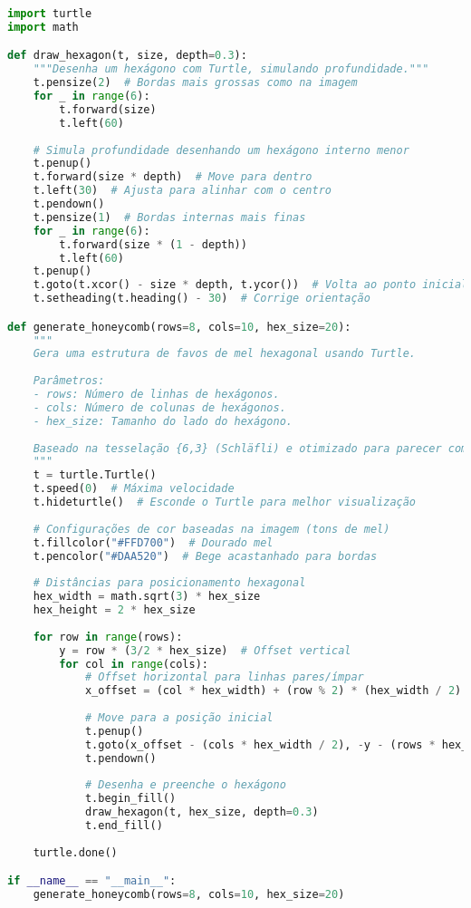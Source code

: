 \documentclass[12pt,a4paper,oneside]{extarticle}
\begin{document}
\begin{lstlisting}[language=python]
import turtle
import math

def draw_hexagon(t, size, depth=0.3):
    """Desenha um hexágono com Turtle, simulando profundidade."""
    t.pensize(2)  # Bordas mais grossas como na imagem
    for _ in range(6):
        t.forward(size)
        t.left(60)
    
    # Simula profundidade desenhando um hexágono interno menor
    t.penup()
    t.forward(size * depth)  # Move para dentro
    t.left(30)  # Ajusta para alinhar com o centro
    t.pendown()
    t.pensize(1)  # Bordas internas mais finas
    for _ in range(6):
        t.forward(size * (1 - depth))
        t.left(60)
    t.penup()
    t.goto(t.xcor() - size * depth, t.ycor())  # Volta ao ponto inicial
    t.setheading(t.heading() - 30)  # Corrige orientação

def generate_honeycomb(rows=8, cols=10, hex_size=20):
    """
    Gera uma estrutura de favos de mel hexagonal usando Turtle.
    
    Parâmetros:
    - rows: Número de linhas de hexágonos.
    - cols: Número de colunas de hexágonos.
    - hex_size: Tamanho do lado do hexágono.
    
    Baseado na tesselação {6,3} (Schläfli) e otimizado para parecer com a imagem.
    """
    t = turtle.Turtle()
    t.speed(0)  # Máxima velocidade
    t.hideturtle()  # Esconde o Turtle para melhor visualização
    
    # Configurações de cor baseadas na imagem (tons de mel)
    t.fillcolor("#FFD700")  # Dourado mel
    t.pencolor("#DAA520")  # Bege acastanhado para bordas
    
    # Distâncias para posicionamento hexagonal
    hex_width = math.sqrt(3) * hex_size
    hex_height = 2 * hex_size
    
    for row in range(rows):
        y = row * (3/2 * hex_size)  # Offset vertical
        for col in range(cols):
            # Offset horizontal para linhas pares/ímpar
            x_offset = (col * hex_width) + (row % 2) * (hex_width / 2)
            
            # Move para a posição inicial
            t.penup()
            t.goto(x_offset - (cols * hex_width / 2), -y - (rows * hex_height / 4))  # Centraliza
            t.pendown()
        
            # Desenha e preenche o hexágono
            t.begin_fill()
            draw_hexagon(t, hex_size, depth=0.3)
            t.end_fill()
    
    turtle.done()

if __name__ == "__main__":
    generate_honeycomb(rows=8, cols=10, hex_size=20)
\end{lstlisting}
\end{document}
